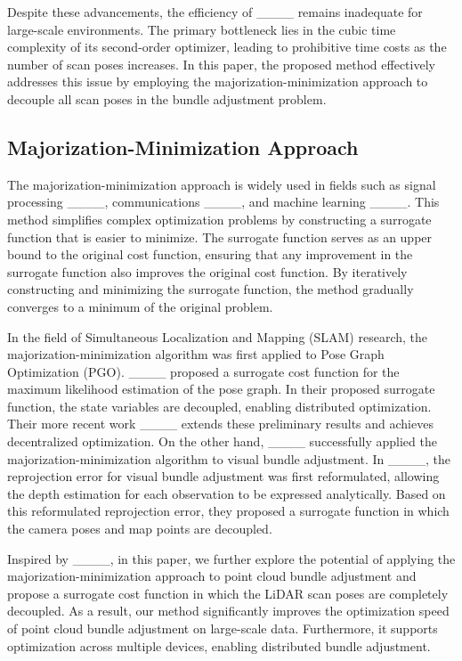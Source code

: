 Despite these advancements, the efficiency of ____ remains inadequate for large-scale environments. The primary bottleneck lies in the cubic time complexity of its second-order optimizer, leading to prohibitive time costs as the number of scan poses increases. In this paper, the proposed method effectively addresses this issue by employing the majorization-minimization approach to decouple all scan poses in the bundle adjustment problem.

\subsection{Majorization-Minimization Approach}
The majorization-minimization approach is widely used in fields such as signal processing ____, communications ____, and machine learning ____. This method simplifies complex optimization problems by constructing a surrogate function that is easier to minimize. The surrogate function serves as an upper bound to the original cost function, ensuring that any improvement in the surrogate function also improves the original cost function. By iteratively constructing and minimizing the surrogate function, the method gradually converges to a minimum of the original problem.


In the field of {Simultaneous Localization and Mapping (SLAM)} research, the majorization-minimization algorithm was first applied to Pose Graph Optimization (PGO). ____ proposed a surrogate cost function for the maximum likelihood estimation of the pose graph. In their proposed surrogate function, the state variables are decoupled, enabling distributed optimization. Their more recent work ____ extends these preliminary results and achieves decentralized optimization. On the other hand, ____ successfully applied the majorization-minimization algorithm to visual bundle adjustment. In ____, the reprojection error for visual bundle adjustment was first reformulated, allowing the depth estimation for each observation to be expressed analytically. Based on this reformulated reprojection error, they proposed a surrogate function in which the camera poses and map points are decoupled.

Inspired by ____, in this paper, we further explore the potential of applying the majorization-minimization approach to point cloud bundle adjustment and propose a surrogate cost function in which the LiDAR scan poses are completely decoupled. As a result, our method significantly improves the optimization speed of point cloud bundle adjustment on large-scale data. Furthermore, it supports optimization across multiple devices, enabling distributed bundle adjustment.

